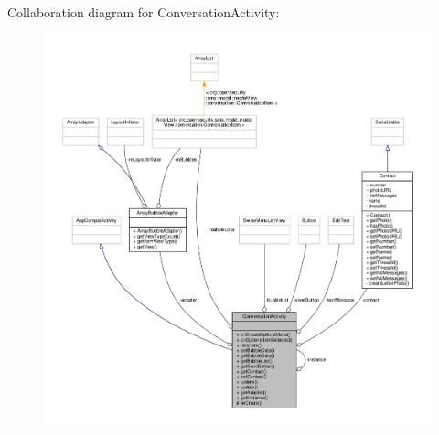 Collaboration diagram for Conversation\+Activity\+:
\nopagebreak
\begin{figure}[H]
\begin{center}
\leavevmode
\includegraphics[width=350pt]{a00079}
\end{center}
\end{figure}

